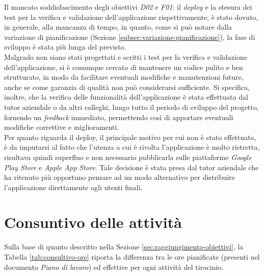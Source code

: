 \noindent Il mancato soddisfascimento degli obiettivi \emph{D02} e \emph{F01}: il \emph{deploy} e la stesura dei test per la verifica e validazione dell'applicazione rispettivamente; è stato dovuto, in generale, alla mancanza di tempo, in quanto, come si può notare dalla variazione di pianificazione (Sezione \ref{subsec:variazione-pianificazione}), la fase di sviluppo è stata più lunga del previsto.\\
Malgrado non siano stati progettati e scritti i test per la verifica e validazione dell'applicazione, si è comunque cercato di mantenere un codice pulito e ben strutturato, in modo da facilitare eventuali modifiche e manutenzioni future, anche se come garanzia di qualità non può considerarsi sufficiente.
Si specifica, inoltre, che la verifica delle funzionalità dell'applicazione è stata effettuata dal tutor aziendale o da altri colleghi, lungo tutto il periodo di sviluppo del progetto, fornendo un \emph{feedback} immediato, permettendo così di apportare eventuali modifiche correttive e miglioramenti.\\
Per quanto riguarda il \gls{deploy}\glsoccur, il principale motivo per cui non è stato effettuato, è da imputarsi al fatto che l'utenza a cui è rivolta l'applicazione è molto ristretta, risultava quindi superfluo e non necessario pubblicarla sulle piattaforme \emph{Google Play Store} e \emph{Apple App Store}. Tale decisione è stata presa dal tutor aziendale che ha ritenuto più opportuno pensare ad un modo alternativo per distribuire l'applicazione direttamente agli utenti finali.

\section{Consuntivo delle attività}
\label{sec:consultivo-attivita}

Sulla base di quanto descritto nella Sezione \ref{sec:raggiungimento-obiettivi}, la Tabella \ref{tab:consultivo-ore} riporta la differenza tra le ore pianificate (presenti nel documento \emph{Piano di lavoro}) ed effettive per ogni attività del tirocinio.

